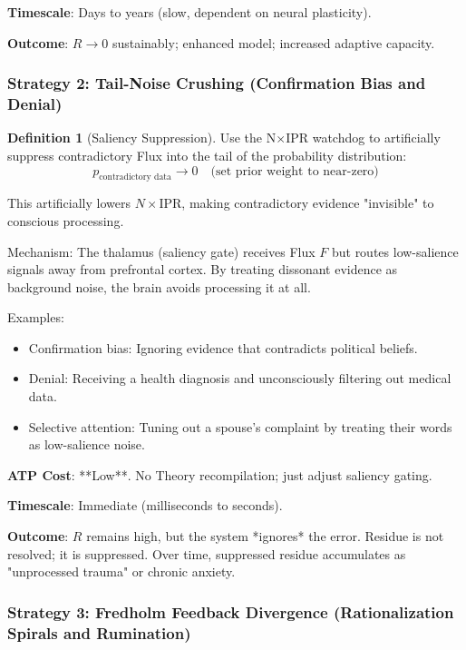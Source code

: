 \documentclass[11pt,oneside]{article}
\theoremstyle{definition}
\newtheorem{definition}[theorem]{Definition}
\begin{document}
\textbf{Timescale}: Days to years (slow, dependent on neural plasticity).

\textbf{Outcome}: $R \to 0$ sustainably; enhanced model; increased adaptive capacity.

\subsubsection{Strategy 2: Tail-Noise Crushing (Confirmation Bias and Denial)}

\begin{definition}[Saliency Suppression]
Use the N\ensuremath{\times}IPR watchdog to artificially suppress contradictory Flux into the tail of the probability distribution:
\[
p_{\text{contradictory data}} \to 0 \quad \text{(set prior weight to near-zero)}
\]

This artificially lowers $N \times \text{IPR}$, making contradictory evidence "invisible" to conscious processing.

Mechanism: The thalamus (saliency gate) receives Flux $F$ but routes low-salience signals away from prefrontal cortex. By treating dissonant evidence as background noise, the brain avoids processing it at all.
\end{definition}

Examples:
\begin{itemize}
  \item Confirmation bias: Ignoring evidence that contradicts political beliefs.
  \item Denial: Receiving a health diagnosis and unconsciously filtering out medical data.
  \item Selective attention: Tuning out a spouse's complaint by treating their words as low-salience noise.
\end{itemize}

\textbf{ATP Cost}: **Low**. No Theory recompilation; just adjust saliency gating.

\textbf{Timescale}: Immediate (milliseconds to seconds).

\textbf{Outcome}: $R$ remains high, but the system *ignores* the error. Residue is not resolved; it is suppressed. Over time, suppressed residue accumulates as "unprocessed trauma" or chronic anxiety.

\subsubsection{Strategy 3: Fredholm Feedback Divergence (Rationalization Spirals and Rumination)}
\end{document}

